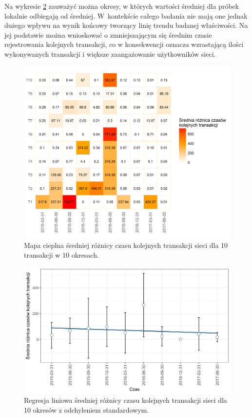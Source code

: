 \documentclass[12pt, twoside, final, openany]{mgr}
\newcommand{\chartsWidth}{0.8}
\begin{document}
\indent Na wykresie \ref{fig:rc2} zauważyć można okresy, w których wartości średniej dla próbek lokalnie odbiegają od średniej. W~kontekście całego badania nie mają one jednak dużego wpływu na wynik końcowy tworzący linię trendu badanej właściwości. Na jej podstawie można wnioskować o zmniejszającym się średnim czasie rejestrowania kolejnych transakcji, co w konsekwencji oznacza wzrastającą ilości wykonywanych transakcji i większe zaangażowanie użytkowników sieci. 
 
\begin{figure}[H]
\centering
   \includegraphics[width=\chartsWidth\linewidth]{pictures/roznica_czasow/roznica_czasow_hm.png}
   \caption{Mapa cieplna średniej różnicy czasu kolejnych transakcji sieci dla 10 transakcji w 10 okresach.}
   \label{fig:rc1} 
\end{figure}
\newpage
\begin{figure}[H]
\centering
   \includegraphics[width=\chartsWidth\linewidth]{pictures/roznica_czasow/roznica_czasow_sda.png}
   \caption{Regresja liniowa średniej różnicy czasu kolejnych transakcji sieci dla 10 okresów z odchyleniem standardowym.}
   \label{fig:rc2}
\end{figure}
\end{document}
